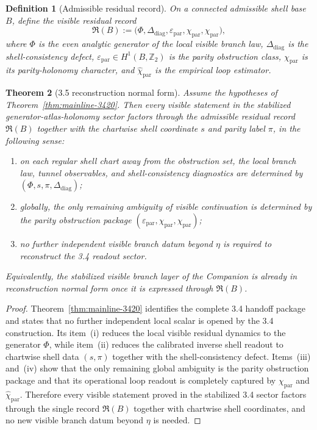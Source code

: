\documentclass[12pt,a4paper]{article}
\newtheorem{theorem}{Theorem}[section]
\newtheorem{definition}[theorem]{Definition}
\begin{document}
\begin{definition}[Admissible residual record]
\label{def:mainline-3500}
On a connected admissible shell base $B$, define the visible residual record
\[
 \mathfrak R(B)
 :=
 \bigl(\Phi,\Delta_{\mathrm{diag}},\varepsilon_{\mathrm{par}},\chi_{\mathrm{par}},\widehat\chi_{\mathrm{par}}\bigr),
\]
where $\Phi$ is the even analytic generator of the local visible branch law, $\Delta_{\mathrm{diag}}$ is the shell-consistency defect, $\varepsilon_{\mathrm{par}}\in H^1(B,\mathbb Z_2)$ is the parity obstruction class, $\chi_{\mathrm{par}}$ is its parity-holonomy character, and $\widehat\chi_{\mathrm{par}}$ is the empirical loop estimator.
\end{definition}

\begin{theorem}[3.5 reconstruction normal form]
\label{thm:mainline-3500}
Assume the hypotheses of Theorem~\ref{thm:mainline-3420}. Then every visible statement in the stabilized generator-atlas-holonomy sector factors through the admissible residual record $\mathfrak R(B)$ together with the chartwise shell coordinate $s$ and parity label $\pi$, in the following sense:
\begin{enumerate}[label=(\roman*), leftmargin=2em]
 \item on each regular shell chart away from the obstruction set, the local branch law, tunnel observables, and shell-consistency diagnostics are determined by $(\Phi,s,\pi,\Delta_{\mathrm{diag}})$;
 \item globally, the only remaining ambiguity of visible continuation is determined by the parity obstruction package $(\varepsilon_{\mathrm{par}},\chi_{\mathrm{par}},\widehat\chi_{\mathrm{par}})$;
 \item no further independent visible branch datum beyond $\eta$ is required to reconstruct the 3.4 readout sector.
\end{enumerate}
Equivalently, the stabilized visible branch layer of the Companion is already in reconstruction normal form once it is expressed through $\mathfrak R(B)$.
\end{theorem}

\begin{proof}
Theorem~\ref{thm:mainline-3420} identifies the complete 3.4 handoff package and states that no further independent local scalar is opened by the 3.4 construction. Its item~(i) reduces the local visible residual dynamics to the generator $\Phi$, while item~(ii) reduces the calibrated inverse shell readout to chartwise shell data $(s,\pi)$ together with the shell-consistency defect. Items~(iii) and~(iv) show that the only remaining global ambiguity is the parity obstruction package and that its operational loop readout is completely captured by $\chi_{\mathrm{par}}$ and $\widehat\chi_{\mathrm{par}}$. Therefore every visible statement proved in the stabilized 3.4 sector factors through the single record $\mathfrak R(B)$ together with chartwise shell coordinates, and no new visible branch datum beyond $\eta$ is needed.
\end{proof}
\end{document}
